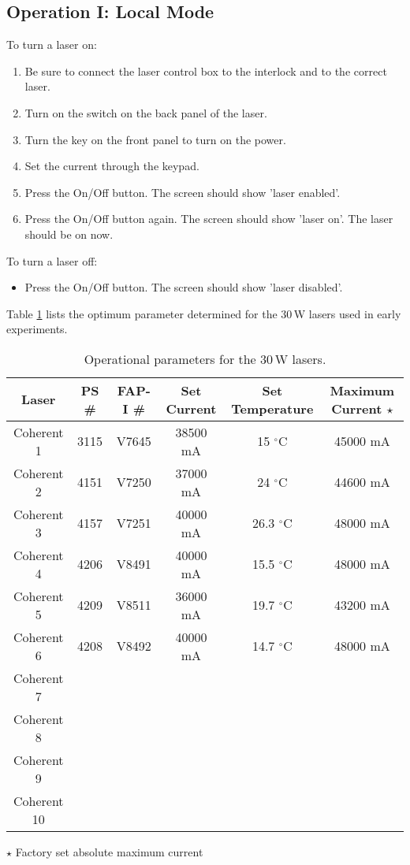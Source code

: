 {\subsection{Operation I: Local Mode}
To turn a laser on:
\begin{enumerate} \setlength{\parskip}{0ex}
\item Be sure to connect the laser control box to the interlock and to
the correct laser.
\item Turn on the switch on the back panel of the laser.
\item Turn the key on the front panel to turn on the power.
\item Set the current through the keypad.
\item Press the On/Off button.  The screen should show 'laser enabled'.
\item Press the On/Off button again.  The screen should show 'laser on'. The 
      laser should be on now.
\end{enumerate}
To turn a laser off:
\begin{itemize}
\item Press the On/Off button.  The screen should show 'laser disabled'.
\end{itemize}

Table \ref{tab:laserparam} lists the optimum parameter
determined for the 30\,W lasers used in early experiments.

\begin{table}[hbp]
\begin{center}
\begin{tabular}{|c|c|c|c|c|c|}\hline

 Laser        & PS \#  &  FAP-I \#  &  Set Current & Set Temperature & Maximum Current $\star$\\ \hline
 Coherent 1   & 3115   &  V7645     & 38500 mA  &   15 $^\circ$C     &  45000 mA\\ \hline
 Coherent 2   & 4151   &  V7250     & 37000 mA  &   24 $^\circ$C     & 44600 mA    \\ \hline
 Coherent 3   & 4157   &  V7251     & 40000 mA  &   26.3 $^\circ$C   & 48000 mA    \\ \hline
 Coherent 4   & 4206   &  V8491     & 40000 mA  &   15.5 $^\circ$C   & 48000 mA    \\ \hline
 Coherent 5   & 4209   &  V8511     & 36000 mA  &   19.7 $^\circ$C   & 43200 mA    \\ \hline
 Coherent 6   & 4208   &  V8492     & 40000 mA  &   14.7 $^\circ$C   & 48000 mA    \\ \hline
 Coherent 7  && & &  &       \\ \hline
 Coherent 8  && & &  &       \\ \hline
 Coherent 9  && & &  &       \\ \hline
 Coherent 10  && & &  &       \\ \hline
\end{tabular}
 $\star$ Factory set absolute maximum current 
\end{center}
\caption{Operational parameters for the 30\,W lasers.}
\label{tab:laserparam}
\end{table}



}
